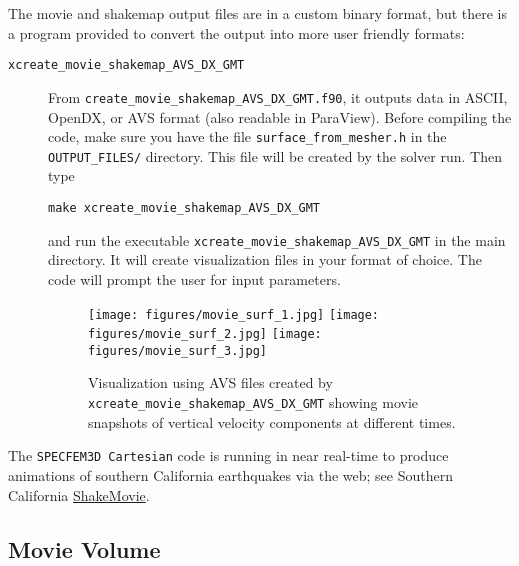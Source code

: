 The movie and shakemap output files are in a custom binary format, but there is
a program provided to convert the output into more user friendly formats:
\begin{description}
\item [{\texttt{xcreate\_movie\_shakemap\_AVS\_DX\_GMT}}]
From \texttt{create\_movie\_shakemap\_AVS\_DX\_GMT.f90},
it outputs data in ASCII, OpenDX, or AVS format (also readable in
ParaView). Before compiling the code, make sure you have the file
\texttt{surface\_from\_mesher.h} in the \texttt{OUTPUT\_FILES/} directory.
This file will be created by the solver run. Then type

{\footnotesize
\begin{verbatim}
make xcreate_movie_shakemap_AVS_DX_GMT
\end{verbatim}
}
and run the executable \texttt{xcreate\_movie\_shakemap\_AVS\_DX\_GMT}
in the main directory. It will create visualization files
in your format of choice. The code will prompt the user for input
parameters.


\begin{figure}[htbp]
\begin{centering}
\texttt{[image: figures/movie\_surf\_1.jpg]}
\texttt{[image: figures/movie\_surf\_2.jpg]}
\texttt{[image: figures/movie\_surf\_3.jpg]}
\par
\end{centering}
\caption{Visualization using AVS files created by \texttt{xcreate\_movie\_shakemap\_AVS\_DX\_GMT}
showing movie snapshots of vertical velocity components at different times.}
\label{fig:movie.surf}
\end{figure}

\end{description}
The \texttt{SPECFEM3D Cartesian} code is running in near real-time
to produce animations of southern California earthquakes via the web;
see Southern California \href{www.shakemovie.caltech.edu}{ShakeMovie\textregistered{}}.


\subsection{Movie Volume}\label{sub:Movie-Volume}

